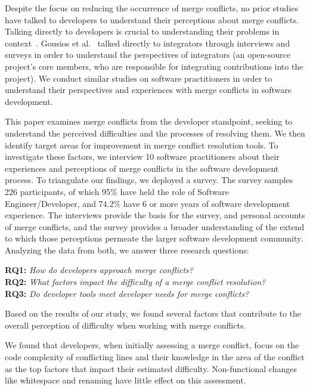 Despite the focus on reducing the occurrence of merge conflicts, no prior studies have talked to developers to understand their perceptions about merge conflicts.
Talking directly to developers is crucial to understanding their problems in context~\cite{fritz2010using, sillito2006questions, de2008answering, ko2007information}.
Gousios et al.~\cite{integrator_perspective} talked directly to integrators through interviews and surveys in order to understand the perspectives of integrators (an open-source project's core members, who are responsible for integrating contributions into the project).
We conduct similar studies on software practitioners in order to understand their perspectives and experiences with merge conflicts in software development.

This paper examines merge conflicts from the developer standpoint, seeking to understand the perceived difficulties and the processes of resolving them.
We then identify target areas for improvement in merge conflict resolution tools.
To investigate these factors, we interview 10 software practitioners about their experiences and perceptions of merge conflicts in the software development process.
To triangulate our findings, we deployed a survey.
The survey samples 226 participants, of which 95\% have held the role of Software Engineer/Developer, and 74.2\% have 6 or more years of software development experience.
The interviews provide the basis for the survey, and personal accounts of merge conflicts, and the survey provides a broader understanding of the extend to which those perceptions permeate the larger software development community.
Analyzing the data from both, we answer three research questions:

\vspace{3px}
\noindent\textbf{RQ1:} \textit{How do developers approach merge conflicts?}\\
\noindent\textbf{RQ2:} \textit{What factors impact the difficulty of a merge conflict resolution?}\\
\noindent\textbf{RQ3:} \textit{Do developer tools meet developer needs for merge conflicts?}
\vspace{3px}

Based on the results of our study, we found several factors that contribute to the overall perception of difficulty when working with merge conflicts.

We found that developers, when initially assessing a merge conflict, focus on the code complexity of conflicting lines and their knowledge in the area of the conflict as the top factors that impact their estimated difficulty.
Non-functional changes like whitespace and renaming have little effect on this assessment. 

